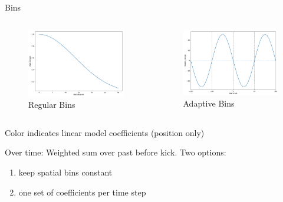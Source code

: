 \documentclass{beamer}
\begin{document}
\begin{frame}{Bins}
 \begin{columns}
   \begin{column}{0.5\textwidth}
     \begin{figure}[h]
       \centering
\includegraphics[clip, width=1\linewidth, draft]{wall_force.pdf}
       \caption*{Regular Bins}
     \end{figure}
   \end{column}
   
   \begin{column}{0.5\textwidth}
     \begin{figure}[h]
       \centering
\includegraphics[clip, width=1\linewidth, draft]{wall_odd.pdf}
       \caption*{Adaptive Bins}
     \end{figure}
   \end{column}
  \end{columns}

Color indicates linear model coefficients (position only)

Over time: Weighted sum over past before kick. Two options:
\begin{enumerate}
\item keep spatial bins constant  
\item one set of coefficients per time step
\end{enumerate}
\end{frame}
\end{document}
